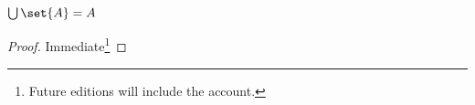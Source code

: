 \begin{proposition}
	$\bigcup \set{A} = A$
\end{proposition}
\begin{proof}
Immediate\footnote{Future editions will include the account.}
\end{proof}